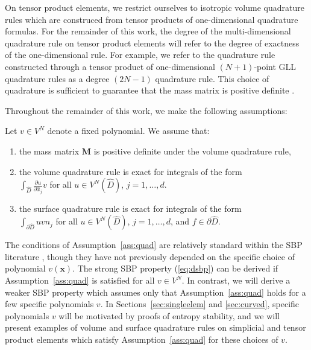 \documentclass{svjour3}                     %
\renewcommand{\hat}{\widehat}
\newcommand{\pd}[2]{\frac{\partial#1}{\partial#2}}
\newcommand{\LRp}[1]{\left( #1 \right)}
\begin{document}
On tensor product elements, we restrict ourselves to isotropic volume quadrature rules which are construced from tensor products of one-dimensional quadrature formulas.  For the remainder of this work, the degree of the multi-dimensional quadrature rule on tensor product elements will refer to the degree of exactness of the one-dimensional rule.  For example, we refer to the quadrature rule constructed through a tensor product of one-dimensional $(N+1)$-point GLL quadrature rules as a degree $(2N-1)$ quadrature rule.  This choice of quadrature is sufficient to guarantee that the mass matrix is positive definite \cite{canuto2007spectral}.  

Throughout the remainder of this work, we make the following assumptions:
\begin{assumption}
\label{ass:quad}
Let $v \in V^{N}$ denote a fixed polynomial.  We assume that: 
\begin{enumerate}
\item the mass matrix $\bm{M}$ is positive definite under the volume quadrature rule,
\item the volume quadrature rule is exact for integrals of the form\\$\int_{\hat{D}} \pd{u}{\hat{x}_j} v$ for all $u \in V^N\LRp{\hat{D}}$, $j = 1,\ldots, d$.
\item the surface quadrature rule is exact for integrals of the form\\$\int_{\partial \hat{D}} u v n_j$ for all $u \in V^N\LRp{\hat{D}}$, $j = 1,\ldots, d$, and $f \in \partial \hat{D}$.  
\end{enumerate}
\end{assumption}

The conditions of Assumption~\ref{ass:quad} are relatively standard within the SBP literature \cite{hicken2016multidimensional, chan2017discretely, crean2018entropy}, though they have not previously depended on the specific choice of polynomial $v(\bm{x})$.   The strong SBP property (\ref{eq:dsbp}) can be derived if Assumption~\ref{ass:quad} is satisfied for all $v \in V^N$.  In contrast, we will derive a weaker SBP property which assumes only that Assumption~\ref{ass:quad} holds for a few specific polynomials $v$.  In Sections~\ref{sec:singleelem} and \ref{sec:curved}, specific polynomials $v$ will be motivated by proofs of entropy stability, and we will present examples of volume and surface quadrature rules on simplicial and tensor product elements which satisfy Assumption~\ref{ass:quad} for these choices of $v$.  
\end{document}
